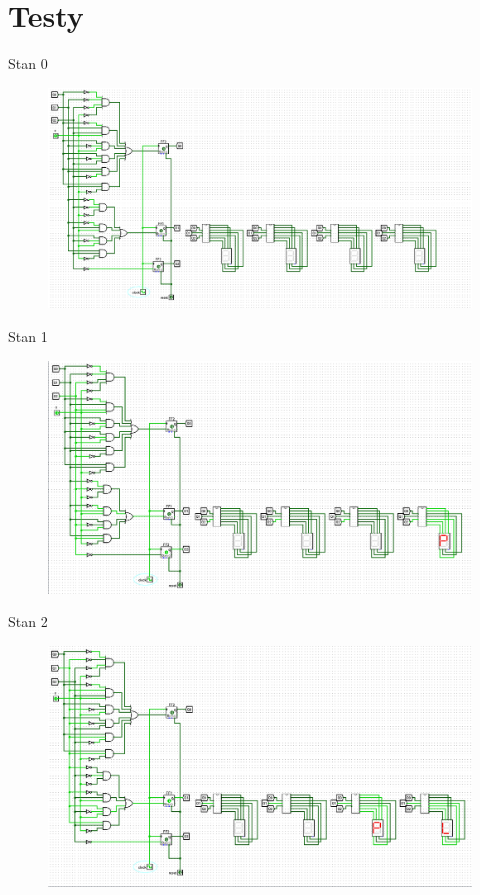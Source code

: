 \documentclass[]{article}
\begin{document}
\section{Testy}
Stan 0
\begin{figure}[H]
	\centering
	\includegraphics[width=1.25\textwidth]{0.png}
\end{figure}
\newpage
Stan 1
\begin{figure}[H]
	\centering
	\includegraphics[width=1.0\textwidth]{1.png}
\end{figure}
\newpage
Stan 2
\begin{figure}[H]
	\centering
	\includegraphics[width=1.2\textwidth]{2.png}
\end{figure}
\end{document}
